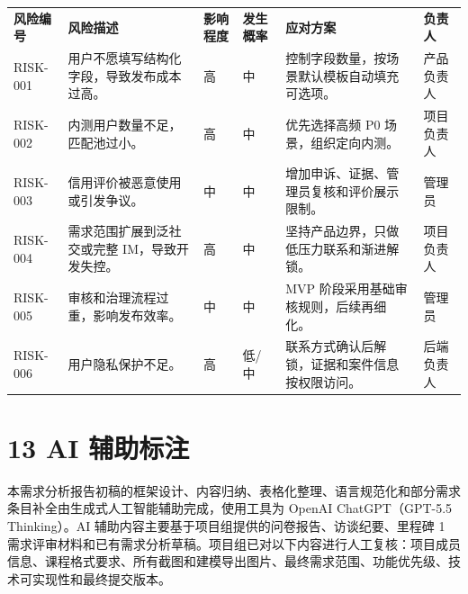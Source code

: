 {\def\LTcaptype{none} %
\begin{xltabular}{\textwidth}{@{}>{\centering\arraybackslash}X>{\centering\arraybackslash}X>{\centering\arraybackslash}X>{\centering\arraybackslash}X>{\centering\arraybackslash}X>{\centering\arraybackslash}X@{}}
\toprule\noalign{}
\endhead
\bottomrule\noalign{}
\endlastfoot
\textbf{风险编号} & \textbf{风险描述} & \textbf{影响程度} &
\textbf{发生概率} & \textbf{应对方案} & \textbf{负责人} \\
RISK-001 & 用户不愿填写结构化字段，导致发布成本过高。 & 高 & 中 &
控制字段数量，按场景默认模板自动填充可选项。 & 产品负责人 \\
RISK-002 & 内测用户数量不足，匹配池过小。 & 高 & 中 & 优先选择高频 P0
场景，组织定向内测。 & 项目负责人 \\
RISK-003 & 信用评价被恶意使用或引发争议。 & 中 & 中 &
增加申诉、证据、管理员复核和评价展示限制。 & 管理员 \\
RISK-004 & 需求范围扩展到泛社交或完整 IM，导致开发失控。 & 高 & 中 &
坚持产品边界，只做低压力联系和渐进解锁。 & 项目负责人 \\
RISK-005 & 审核和治理流程过重，影响发布效率。 & 中 & 中 & MVP
阶段采用基础审核规则，后续再细化。 & 管理员 \\
RISK-006 & 用户隐私保护不足。 & 高 & 低/中 &
联系方式确认后解锁，证据和案件信息按权限访问。 & 后端负责人 \\
\end{xltabular}
}

\chapter{13 AI 辅助标注}\label{ai-ux8f85ux52a9ux6807ux6ce8}

本需求分析报告初稿的框架设计、内容归纳、表格化整理、语言规范化和部分需求条目补全由生成式人工智能辅助完成，使用工具为
OpenAI ChatGPT（GPT-5.5 Thinking）。AI
辅助内容主要基于项目组提供的问卷报告、访谈纪要、里程碑 1
需求评审材料和已有需求分析草稿。项目组已对以下内容进行人工复核：项目成员信息、课程格式要求、所有截图和建模导出图片、最终需求范围、功能优先级、技术可实现性和最终提交版本。
